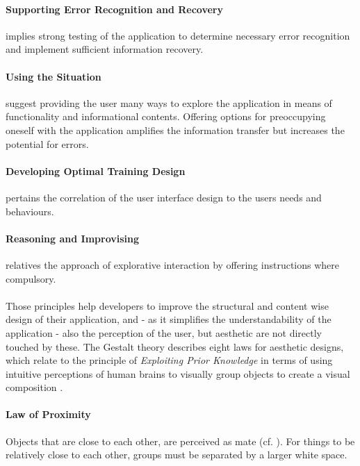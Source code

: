 \paragraph*{Supporting Error Recognition and Recovery} implies strong testing of the application to determine necessary error recognition and implement sufficient information recovery.
\paragraph*{Using the Situation} suggest providing the user many ways to explore the application in means of functionality and informational contents. Offering options for preoccupying oneself with the application amplifies the information transfer but increases the potential for errors.
\paragraph*{Developing Optimal Training Design} pertains the correlation of the user interface design to the users needs and behaviours. 
\paragraph*{Reasoning and Improvising} relatives the approach of explorative interaction by offering instructions where compulsory.
\paragraph*{} Those principles help developers to improve the structural and content wise design of their application, and - as it simplifies the understandability of the application - also the perception of the user, but aesthetic are not directly touched by these. The Gestalt theory describes eight laws for aesthetic designs, which relate to the principle of \textit{Exploiting Prior Knowledge} in terms of using intuitive perceptions of human brains to visually group objects to create a visual composition \parencite[cf.][113]{Sternberg.2012}.
\paragraph*{Law of Proximity} Objects that are close to each other, are perceived as mate (cf. ). For things to be relatively close to each other, groups must be separated by a larger white space. \parencite{Seogaard.n.y.}
